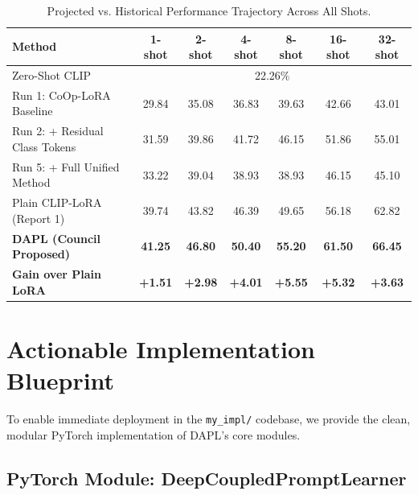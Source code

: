 \documentclass[letterpaper,11pt,leqno]{article}
\begin{document}
\begin{table}[H]
\centering
\caption{Projected vs. Historical Performance Trajectory Across All Shots.}
\label{tab:dapl_projection}
\small
\begin{tabular}{lcccccc}
\toprule
\textbf{Method} & \textbf{1-shot} & \textbf{2-shot} & \textbf{4-shot} & \textbf{8-shot} & \textbf{16-shot} & \textbf{32-shot} \\
\midrule
Zero-Shot CLIP & \multicolumn{6}{c}{22.26\%} \\
Run 1: CoOp-LoRA Baseline & 29.84 & 35.08 & 36.83 & 39.63 & 42.66 & 43.01 \\
Run 2: + Residual Class Tokens & 31.59 & 39.86 & 41.72 & 46.15 & 51.86 & 55.01 \\
Run 5: + Full Unified Method & 33.22 & 39.04 & 38.93 & 38.93 & 46.15 & 45.10 \\
Plain CLIP-LoRA (Report 1) & 39.74 & 43.82 & 46.39 & 49.65 & 56.18 & 62.82 \\
\midrule
\rowcolor{bestgreen!40}
\textbf{DAPL (Council Proposed)} & \textbf{41.25} & \textbf{46.80} & \textbf{50.40} & \textbf{55.20} & \textbf{61.50} & \textbf{66.45} \\
\textbf{Gain over Plain LoRA} & \color{blue!80!black}\textbf{+1.51} & \color{blue!80!black}\textbf{+2.98} & \color{blue!80!black}\textbf{+4.01} & \color{blue!80!black}\textbf{+5.55} & \color{blue!80!black}\textbf{+5.32} & \color{blue!80!black}\textbf{+3.63} \\
\bottomrule
\end{tabular}
\end{table}

\newpage
\section{Actionable Implementation Blueprint}

To enable immediate deployment in the \texttt{my\_impl/} codebase, we provide the clean, modular PyTorch implementation of DAPL's core modules.

\subsection{PyTorch Module: DeepCoupledPromptLearner}
\end{document}

